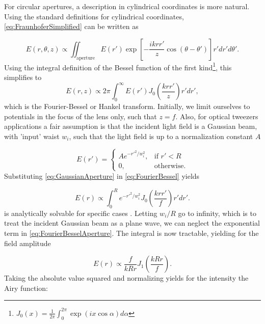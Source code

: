 \vspace*{3mm}

\noindent For circular apertures, a description in cylindrical coordinates is more natural. 
Using the standard definitions for cylindrical coordinates, \cref{eq:FraunhoferSimplified} can be written as

\begin{equation}\label{eq:FraunhoferRTheta}
    E(r,\theta, z) \propto \iint_{\text{aperture}} E(r') \exp{\left[
    -\frac{i k r r'}{z} \cos{(\theta-\theta')} 
    \right]}r'dr'd\theta'.
\end{equation}
Using the integral definition of the Bessel function of the first kind\footnote{$J_0(x) = \frac{1}{2\pi} \int_0^{2\pi} \exp{(i x \cos{\alpha})} d\alpha$}, this simplifies to
\begin{equation}\label{eq:FourierBessel}
    E(r,z) \propto 2\pi \int_0^{\infty} E(r') J_0\left( \frac{k r r'}{z}\right) r'dr',
\end{equation}
which is the Fourier-Bessel or Hankel transform.
Initially, we limit ourselves to potentials in the focus of the lens only, such that $z=f$. Also, for optical tweezers applications a fair assumption is that the incident light field is a Gaussian beam, with 'input' waist $w_i$, such that the light field is up to a normalization constant $A$

\begin{equation}\label{eq:GaussianAperture}
    E(r')=
    \begin{cases}
        A e^{- r'^2/w_i^2},& \text{if } r' < R\\
        0,               & \text{otherwise}.
    \end{cases}
\end{equation}
Substituting \cref{eq:GaussianAperture} in \cref{eq:FourierBessel} yields

\begin{equation}\label{eq:FourierBesselAperture}
    E(r) \propto \int_0^R e^{-r'^2/w_i^2} J_0\left(\frac{k r r'}{f}\right)r'dr'.
\end{equation}
 is analytically solvable for specific cases \cite{Madjarov2020}.
Letting $w_i/R$ go to infinity, which is to treat the incident Gaussian beam as a plane wave, we can neglect the exponential term in \cref{eq:FourierBesselAperture}. 
The integral is now tractable, yielding for the field amplitude

\begin{equation}\label{eq:AiryField}
    E(r) \propto \frac{f}{kRr} J_1\left(\frac{k R r}{f}\right).
\end{equation}
Taking the absolute value squared and normalizing yields for the intensity the Airy function:

